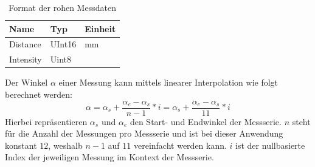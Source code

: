 \begin{table}[H]
    \centering
    \begin{tabular}{l|l|l}
    Name        & Typ       & Einheit   \\ \hline
    Distance    & UInt16    & mm        \\
    Intensity   & Uint8     &           \\ %
    \end{tabular}
    \caption{Format der rohen Messdaten}
    \label{tab:ld20-measurement-data}
\end{table}
Der Winkel $\alpha$ einer Messung kann mittels linearer Interpolation wie folgt berechnet werden:
\begin{equation}
    \alpha = \alpha_{s} + \frac{\alpha_{e}-\alpha_{s}}{n-1}*i = \alpha_{s} + \frac{\alpha_{e}-\alpha_{s}}{11}*i
\end{equation}
Hierbei repräsentieren $\alpha_{s}$ und $\alpha_{e}$ den Start- und Endwinkel der Messserie.
%
$n$ steht für die Anzahl der Messungen pro Messserie und ist bei dieser Anwendung konstant $12$,
weshalb $n-1$ auf $11$ vereinfacht werden kann.
%
$i$ ist der nullbasierte Index der jeweiligen Messung im Kontext der Messserie.



